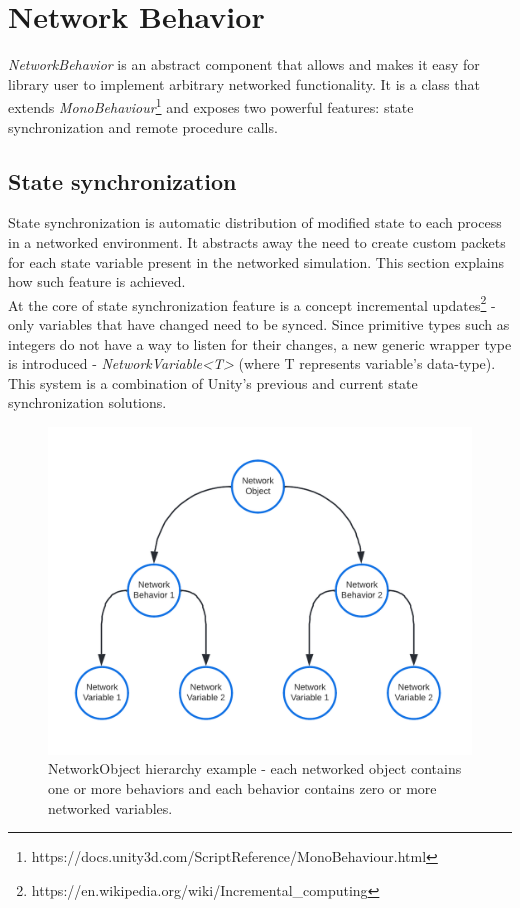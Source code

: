 \documentclass[times, utf8, diplomski]{fer}
\begin{document}
\section{Network Behavior}
\textit{NetworkBehavior} is an abstract component that allows and makes it easy for library user to implement arbitrary networked functionality. It is a class that extends \textit{MonoBehaviour}\footnote{https://docs.unity3d.com/ScriptReference/MonoBehaviour.html} and exposes two powerful features: state synchronization and remote procedure calls.

\subsection{State synchronization}
State synchronization is automatic distribution of modified state to each process in a networked environment. It abstracts away the need to create custom packets for each state variable present in the networked simulation. This section explains how such feature is achieved. \\

At the core of state synchronization feature is a concept incremental updates\footnote{https://en.wikipedia.org/wiki/Incremental\_computing} - only variables that have changed need to be synced. Since primitive types such as integers do not have a way to listen for their changes, a new generic wrapper type is introduced - \textit{NetworkVariable<T>} (where T represents variable's data-type). This system is a combination of Unity's previous \cite{Unity:UNet-SyncVar} and current \cite{Unity:NetworkVariable} state synchronization solutions.\\

\begin{figure}[H]
	\centering
	\includegraphics[scale=0.22]{NetworkObject-tree}
	\caption{NetworkObject hierarchy example - each networked object contains one or more behaviors and each behavior contains zero or more networked variables.}
	\label{fig:network-object-tree}
\end{figure}
\end{document}

